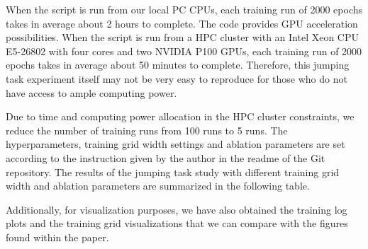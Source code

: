 \documentclass{usiinftr}
\begin{document}
When the script is run from our local PC CPUs, each training run of 2000 epochs takes in average about 2 hours to complete. The code provides GPU acceleration possibilities. When the script is run from a HPC cluster with an Intel Xeon CPU E5-26802 with four cores and two NVIDIA P100 GPUs, each training run of 2000 epochs takes in average about 50 minutes to complete. Therefore, this jumping task experiment itself may not be very easy to reproduce for those who do not have access to ample computing power.

Due to time and computing power allocation in the HPC cluster constraints, we reduce the number of training runs from 100 runs to 5 runs. The hyperparameters, training grid width settings and ablation parameters are set according to the instruction given by the author in the readme of the Git repository. The results of the jumping task study with different training grid width and ablation parameters are summarized in the following table.


Additionally, for visualization purposes, we have also obtained the training log plots and the training grid visualizations that we can compare with the figures found within the paper.
\end{document}
